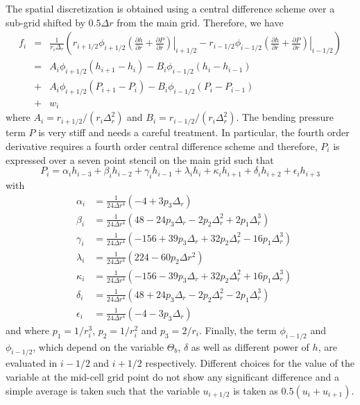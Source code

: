The  spatial discretization  is  obtained using  a central  difference
scheme  over  a  sub-grid  shifted  by $0.5\Delta  r$  from  the  main
grid. Therefore, we have
\begin{eqnarray}
  f_i&=&\frac{1}{r_i \Delta_r}\left(r_{i+1/2}\phi_{i+1/2}\left.\left(\frac{\partial h}{\partial r}+\frac{\partial P}{\partial r}\right)\right|_{i+1/2}-r_{i-1/2}\phi_{i-1/2}\left.\left(\frac{\partial h}{\partial r}+\frac{\partial P}{\partial r}\right)\right|_{i-1/2}\right)\nonumber\\
     &=&A_i\phi_{i+1/2}\left(h_{i+1}-h_i\right)-B_i\phi_{i-1/2}\left(h_{i}-h_{i-1}\right)\nonumber\\
     &+&A_i\phi_{i+1/2}\left(P_{i+1}-P_i\right)-B_i\phi_{i-1/2}\left(P_{i}-P_{i-1}\right)\nonumber\\
     &+&w_i\label{C4-Num-3}
\end{eqnarray}
where                $A_i=r_{i+1/2}/(r_i\Delta_r^2)$               and
$B_i=r_{i-1/2}/(r_i\Delta_r^2)$.   The bending  pressure  term $P$  is
very stiff and  needs a careful treatment.  In  particular, the fourth
order derivative requires a fourth order central difference scheme and
therefore, $P_i$ is  expressed over a seven point stencil  on the main
grid such that
\begin{equation}
  P_{i}=   \alpha_{i}h_{i-3}  +   \beta_{i}h_{i-2}+\gamma_{i}  h_{i-1}
  +\lambda_{i}h_{i}+\kappa_{i}h_{i+1}+\delta_ih_{i+2}+\epsilon_ih_{i+3}
  \label{C4-Num-4}
\end{equation}
with
\begin{eqnarray}
  &\alpha_{i}&=\frac{1}{24\Delta r^{4}}\left(-4+3p_3\Delta_r \right)\nonumber \\
  &\beta_{i}&=\frac{1}{24\Delta r^{4}}\left(48-24p_3\Delta_r-2p_2\Delta_r^2+2p_1\Delta_r^3\right) \nonumber\\
  &\gamma_{i}&=\frac{1}{24\Delta r^{4}}\left(-156+39p_3\Delta_r+32p_2\Delta_r^2-16p_1\Delta_r^3\right)\nonumber\\
  &\lambda_{i}&=\frac{1}{24\Delta r^{4}}\left(224-60p_2\Delta r^{2}\right) \nonumber\\
  &\kappa_{i}&=\frac{1}{24\Delta r^{4}}\left( -156-39p_3\Delta_r+32p_2\Delta_r^2+16p_1\Delta_r^3\right)\nonumber\\
  &\delta_{i}&=\frac{1}{24\Delta r^{4}}\left( 48+24p_3\Delta_r-2p_2\Delta_r^2-2p_1\Delta_r^3\right) \nonumber\\
  &\epsilon_{i}&=\frac{1}{24\Delta r^{4}}\left(-4-3p_3\Delta_r \right)\nonumber
\end{eqnarray}
and where $p_1=1/r_i^3$, $p_2=1/r_i^2$ and $p_3 = 2/r_i$. Finally, the
term $\phi_{i-1/2}$  and $\phi_{i-1/2}$, which depend  on the variable
$\Theta_b$, $\delta$ as well as  different power of $h$, are evaluated
in $i-1/2$ and  $i+1/2$ respectively. Different choices  for the value
of the variable at the mid-cell grid point do not show any significant
difference  and a  simple  average  is taken  such  that the  variable
$u_{i+1/2}$ is taken as $0.5(u_i+u_{i+1})$.

